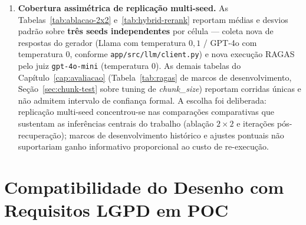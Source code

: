 \documentclass[
  12pt,
  oneside,
  a4paper,
  english,
  brazil
]{abntex2}
\begin{document}
\begin{enumerate}[label=\textbf{L\arabic*}]
        de \textit{Context Recall} indicam problemas de retriever, não
        ausência de informação na base, o que é uma propriedade desejável
        para auditoria mas otimista para benchmark); (ii) ausência de
        questões \textit{ambíguas} ou \textit{mal-formuladas} típicas da
        prática (o autor formulou perguntas inspiradas em consultas reais,
        mas com clareza típica de teste); (iii) o LLM-juiz
        (\texttt{gpt-4o-mini}) pertence à mesma família comercial de um
        dos candidatos avaliados na ablação $2\times2$ (GPT-4o), o que
        introduz a possibilidade de \emph{viés intra-família} a favor desse
        candidato --- ainda que o efeito observado tenha sido o oposto
        (Seção~\ref{sec:ablacao-2x2}), o risco existe e é reconhecido na
        literatura \cite{es2024, ocaf2024}. Mitigação parcial adotada:
        validação cruzada por especialista (Seção~\ref{sec:sessao-expert})
        sobre subconjunto das 38 questões. Mitigação completa --- dataset
        formulado por terceiros, juiz humano ou de família independente,
        e \emph{benchmark} público em PT-BR --- está listada em Trabalhos
        Futuros (TF8);
  \item \textbf{Cobertura assimétrica de replicação multi-seed.} As
        Tabelas~\ref{tab:ablacao-2x2} e~\ref{tab:hybrid-rerank} reportam
        médias e desvios padrão sobre \textbf{três seeds independentes} por
        célula --- coleta nova de respostas do gerador (Llama com
        temperatura $0{,}1$ / GPT-4o com temperatura $0$, conforme
        \texttt{app/src/llm/client.py}) e nova execução RAGAS pelo juiz
        \texttt{gpt-4o-mini} (temperatura $0$). As demais tabelas do
        Capítulo~\ref{cap:avaliacao} (Tabela~\ref{tab:ragas} de marcos de
        desenvolvimento, Seção~\ref{sec:chunk-test} sobre tuning de
        \textit{chunk\_size}) reportam corridas únicas e não admitem
        intervalo de confiança formal. A escolha foi deliberada: replicação
        multi-seed concentrou-se nas comparações comparativas que sustentam
        as inferências centrais do trabalho (ablação $2 \times 2$ e
        iterações pós-recuperação); marcos de desenvolvimento histórico e
        ajustes pontuais não suportariam ganho informativo proporcional ao
        custo de re-execução.
\end{enumerate}

\section{Compatibilidade do Desenho com Requisitos LGPD em POC}
\end{document}
